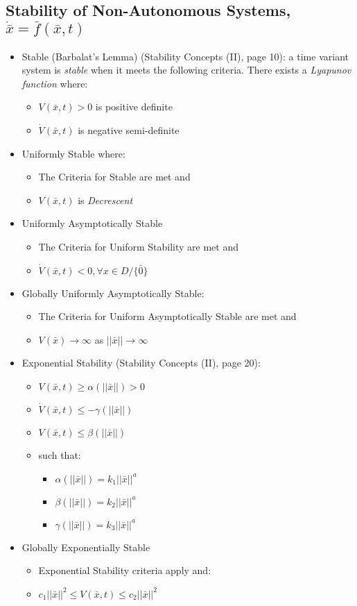 \documentclass[12pt]{article}
\begin{document}
\subsection*{Stability of Non-Autonomous Systems, $\dot{\bar{x}}=\bar{f}(\bar{x},t)$}
\begin{itemize}
\item Stable (Barbalat's Lemma) (Stability Concepts (II), page 10): a time variant system is {\em stable} when it meets the following criteria. There exists a {\em Lyapunov function} where:
	\begin{itemize}
	\item $V(\bar{x},t)>0$ is positive definite
	\item $\dot{V}(\bar{x},t)$ is negative semi-definite 
	\end{itemize}
\item Uniformly Stable where:
	\begin{itemize}
	\item The Criteria for Stable are met and
	\item $V(\bar{x},t)$ is {\em Decrescent}
	\end{itemize}
\item Uniformly Asymptotically Stable
	\begin{itemize}
	\item The Criteria for Uniform Stability are met and
	\item $\dot{V}(\bar{x},t)<0,\forall x \in D/\{\bar{0}\}$
	\end{itemize}
\item Globally Uniformly Asymptotically Stable:
	\begin{itemize}
	\item The Criteria for Uniform Asymptotically Stable are met and
	\item $V(\bar{x})\to\infty$ as $||\bar{x}||\to\infty$
	\end{itemize}
\item Exponential Stability (Stability Concepts (II), page 20):
	\begin{itemize}
	\item $V(\bar{x},t)\geq\alpha(||\bar{x}||)>0$
	\item $\dot{V}(\bar{x},t)\leq-\gamma(||\bar{x}||)$
	\item $V(\bar{x},t)\leq\beta(||\bar{x}||)$
	\item such that:
		\begin{itemize}
		\item $\alpha(||\bar{x}||)=k_1||\bar{x}||^a$
		\item $\beta(||\bar{x}||)=k_2||\bar{x}||^a$
		\item $\gamma(||\bar{x}||)=k_3||\bar{x}||^a$
		\end{itemize}
	\end{itemize}
\item Globally Exponentially Stable
	\begin{itemize}
	\item Exponential Stability criteria apply and:
	\item $c_1||\bar{x}||^2\leq V(\bar{x},t)\leq c_2||\bar{x}||^2$
	\end{itemize}
\end{itemize}
\end{document}
